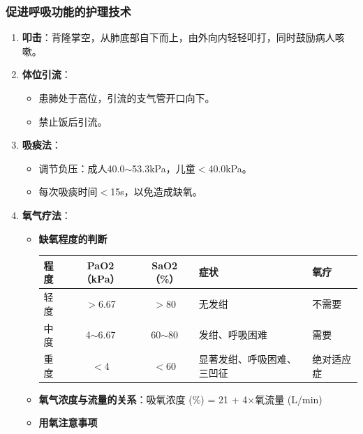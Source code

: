 \documentclass[11pt, a4paper]{ctexart}
\begin{document}
\subsubsection{促进呼吸功能的护理技术}
\begin{enumerate}
	\item \textbf{叩击}：背隆掌空，从肺底部自下而上，由外向内轻轻叩打，同时鼓励病人咳嗽。
	\item \textbf{体位引流}：
	      \begin{itemize}
		      \item 患肺处于高位，引流的支气管开口向下。
		      \item 禁止饭后引流。
	      \end{itemize}
	\item \textbf{吸痰法}：
	      \begin{itemize}
		      \item 调节负压：成人40.0$\sim$53.3kPa，儿童$<$40.0kPa。
		      \item 每次吸痰时间$<$15s，以免造成缺氧。
	      \end{itemize}
	\item \textbf{氧气疗法}：
	      \begin{itemize}
		      \item \textbf{缺氧程度的判断}
		            \begin{table}[htbp]
			            \centering
			            \begin{tabular}{|l|c|c|l|l|}
				            \hline
				            \textbf{程度} & \textbf{PaO2（kPa）} & \textbf{SaO2（\%）} & \textbf{症状}   & \textbf{氧疗} \\
				            \hline
				            轻度          & $>$6.67            & $>$80             & 无发绀           & 不需要         \\
				            中度          & 4$\sim$6.67        & 60$\sim$80        & 发绀、呼吸困难       & 需要          \\
				            重度          & $<$4               & $<$60             & 显著发绀、呼吸困难、三凹征 & 绝对适应症       \\
				            \hline
			            \end{tabular}
		            \end{table}
		      \item \textbf{氧气浓度与流量的关系}：吸氧浓度 (\%) = 21 + 4×氧流量 (L/min)
		      \item \textbf{用氧注意事项}
		            \begin{enumerate}

\end{enumerate}
\end{itemize}
\end{enumerate}
\end{document}
